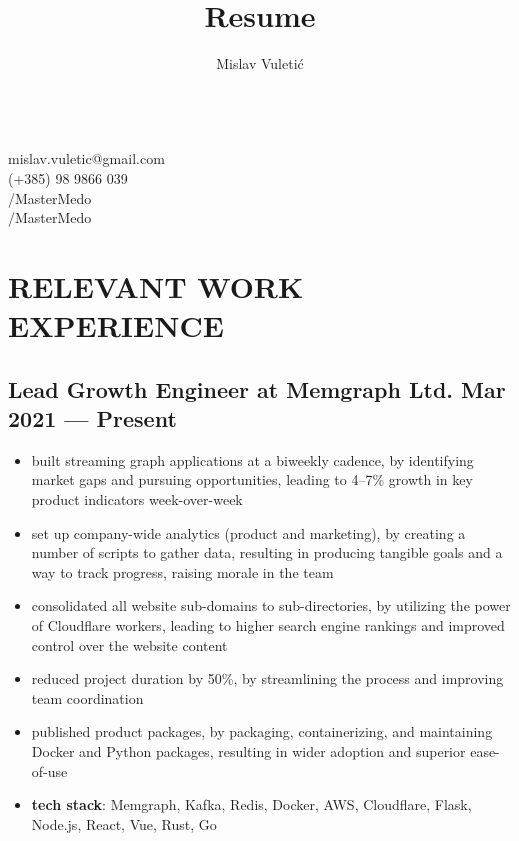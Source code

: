 \documentclass{article}
\begin{document}
\title{Resume}
\author{Mislav Vuletić}

\begin{multicols}{2}
  \fontsize{20}{20}\bfseries
  \theauthor{}

  \fontsize{15}{15}\mdseries
  \mbox{}\\
   mislav.vuletic@gmail.com\\
   (+385) 98 9866 039\\
  /MasterMedo\\
  /MasterMedo
\end{multicols}


\normalsize

\section{RELEVANT WORK EXPERIENCE}
\subsection{Lead Growth Engineer at Memgraph Ltd. \hfill Mar 2021 --- Present}
\begin{itemize}
  \itemsep0em
  \item built streaming graph applications at a biweekly cadence, by identifying market gaps and pursuing opportunities, leading to 4--7\% growth in key product indicators week-over-week
  \item set up company-wide analytics (product and marketing), by creating a number of scripts to gather data, resulting in producing tangible goals and a way to track progress, raising morale in the team
  \item consolidated all website sub-domains to sub-directories, by utilizing the power of Cloudflare workers, leading to higher search engine rankings and improved control over the website content
  \item reduced project duration by 50\%, by streamlining the process and improving team coordination
  \item published product packages, by packaging, containerizing, and maintaining Docker and Python packages, resulting in wider adoption and superior ease-of-use
  \item {\bfseries tech stack}: Memgraph, Kafka, Redis, Docker, AWS, Cloudflare, Flask, Node.js, React, Vue, Rust, Go
\end{itemize}
\end{document}
